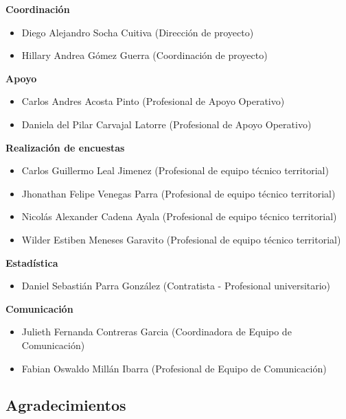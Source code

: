 \documentclass[
]{book}
\begin{document}
\textbf{Coordinación}

\begin{itemize}\item  Diego Alejandro Socha Cuitiva (Dirección de proyecto)\item  Hillary Andrea Gómez Guerra (Coordinación de proyecto)\end{itemize}

\textbf{Apoyo}

\begin{itemize}\item  Carlos Andres Acosta Pinto (Profesional de Apoyo Operativo)\item  Daniela del Pilar Carvajal Latorre (Profesional de Apoyo Operativo)\end{itemize}

\textbf{Realización de encuestas}

\begin{itemize}\item  Carlos Guillermo Leal Jimenez (Profesional de equipo técnico territorial)\item  Jhonathan Felipe Venegas Parra (Profesional de equipo técnico territorial)\item  Nicolás Alexander Cadena Ayala (Profesional de equipo técnico territorial)\item  Wilder Estiben Meneses Garavito (Profesional de equipo técnico territorial)\end{itemize}

\textbf{Estadística}

\begin{itemize}\item  Daniel Sebastián Parra González (Contratista - Profesional universitario)\end{itemize}

\textbf{Comunicación}

\begin{itemize}\item  Julieth Fernanda Contreras Garcia (Coordinadora de Equipo de Comunicación)\item  Fabian Oswaldo Millán Ibarra (Profesional de Equipo de Comunicación)\end{itemize}

\hypertarget{agradecimientos}{%
\subsection*{Agradecimientos}\label{agradecimientos}}
\end{document}
